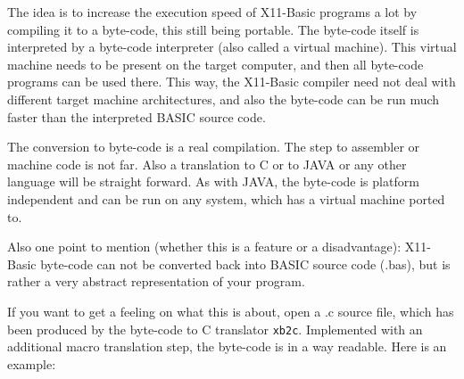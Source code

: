 The idea is to increase the execution speed of X11-Basic programs a lot by 
compiling it to a byte-code, this still being portable. The byte-code itself is 
interpreted by a byte-code interpreter (also called a virtual machine). This
virtual machine needs to be present on the target computer, and then all
byte-code programs can be used there. This way, the X11-Basic compiler need not
deal with different target machine architectures, and also the byte-code can be
run much faster than the interpreted BASIC source code. 

The conversion to byte-code is a real compilation. The step to assembler or
machine code is not far. Also a translation to C or to JAVA or any other
language will be straight forward. As with JAVA, the byte-code is platform
independent and can be run on any system, which has a virtual machine ported to.

Also one point to mention (whether this is a feature or a disadvantage): 
X11-Basic byte-code can not be converted back into BASIC source code (.bas), but
is rather a very abstract representation of your program.

If you want to get a feeling on what this is about, open a .c source file, 
which has been produced by the byte-code to C translator \verb|xb2c|. Implemented
with an  additional macro translation step, the byte-code is in a way readable.
Here is an example:

